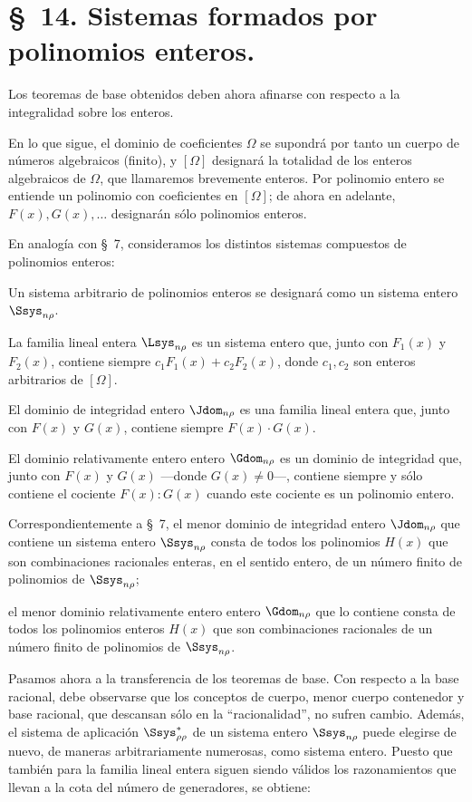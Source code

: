\documentclass[11pt]{article}
\begin{document}
\section*{\S\ 14. Sistemas formados por polinomios enteros.}

Los teoremas de base obtenidos deben ahora afinarse con respecto a la integralidad sobre los enteros.

En lo que sigue, el dominio de coeficientes $\Omega$ se supondrá por tanto un cuerpo de números algebraicos (finito), y $[\Omega]$ designará la totalidad de los enteros algebraicos de $\Omega$, que llamaremos brevemente enteros. Por polinomio entero se entiende un polinomio con coeficientes en $[\Omega]$; de ahora en adelante, $F(x),G(x),\ldots$ designarán sólo polinomios enteros.

En analogía con \S\ 7, consideramos los distintos sistemas compuestos de polinomios enteros:

Un sistema arbitrario de polinomios enteros se designará como un sistema entero $\Ssys_{n\rho}$.

La familia lineal entera $\Lsys_{n\rho}$ es un sistema entero que, junto con $F_1(x)$ y $F_2(x)$, contiene siempre $c_1F_1(x)+c_2F_2(x)$, donde $c_1,c_2$ son enteros arbitrarios de $[\Omega]$.

El dominio de integridad entero $\Jdom_{n\rho}$ es una familia lineal entera que, junto con $F(x)$ y $G(x)$, contiene siempre $F(x)\cdot G(x)$.

El dominio relativamente entero entero $\Gdom_{n\rho}$ es un dominio de integridad que, junto con $F(x)$ y $G(x)$ ---donde $G(x)\ne0$---, contiene siempre y sólo contiene el cociente $F(x):G(x)$ cuando este cociente es un polinomio entero.

Correspondientemente a \S\ 7, el menor dominio de integridad entero $\Jdom_{n\rho}$ que contiene un sistema entero $\Ssys_{n\rho}$ consta de todos los polinomios $H(x)$ que son combinaciones racionales enteras, en el sentido entero, de un número finito de polinomios de $\Ssys_{n\rho}$;

el menor dominio relativamente entero entero $\Gdom_{n\rho}$ que lo contiene consta de todos los polinomios enteros $H(x)$ que son combinaciones racionales de un número finito de polinomios de $\Ssys_{n\rho}$.

Pasamos ahora a la transferencia de los teoremas de base. Con respecto a la base racional, debe observarse que los conceptos de cuerpo, menor cuerpo contenedor y base racional, que descansan sólo en la ``racionalidad'', no sufren cambio. Además, el sistema de aplicación $\Ssys^*_{\rho\rho}$ de un sistema entero $\Ssys_{n\rho}$ puede elegirse de nuevo, de maneras arbitrariamente numerosas, como sistema entero. Puesto que también para la familia lineal entera siguen siendo válidos los razonamientos que llevan a la cota del número de generadores, se obtiene:
\end{document}
